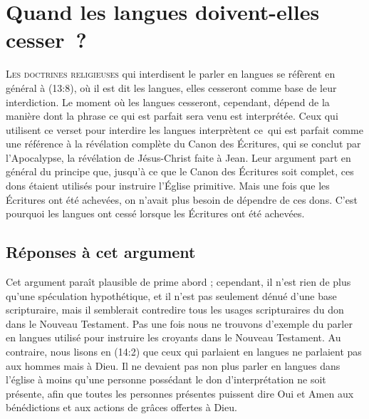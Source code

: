 \chapter{Quand les langues doivent-elles cesser~?}

\lettrine{L}{es doctrines religieuses} qui interdisent le parler en langues
 se réfèrent en général à (13:8), où il est dit\frcolon{}
 \Og les langues, elles cesseront \Fg{} comme base de leur interdiction.
 Le moment où les langues cesseront, cependant, dépend de la manière
 dont la phrase\frcolon{} \Og ce qui est parfait sera venu \Fg{} est interprétée.
 Ceux qui utilisent ce verset pour interdire les langues interprètent
 \Og ce~qui est parfait \Fg{} comme une référence à la révélation complète
 du Canon des Écritures, qui se conclut par l'Apocalypse,
 la révélation de Jésus-Christ faite à Jean. Leur argument part en général du principe que,
 jusqu'à ce que le Canon des Écritures soit complet, ces dons étaient
 utilisés pour instruire l'Église primitive. Mais une fois que les Écritures
 ont été achevées, on n'avait plus besoin de dépendre de ces dons.
 C'est pourquoi les langues ont cessé lorsque les Écritures
 ont été achevées.


\section{R\'eponses \`a cet argument}

Cet argument paraît plausible de prime abord ; cependant, il n'est rien
 de plus qu'une spéculation hypothétique, et il n'est pas seulement dénué
 d'une base scripturaire, mais il semblerait contredire tous les usages
 scripturaires du don dans le Nouveau Testament.
 Pas une fois nous ne trouvons d'exemple du parler en langues utilisé
 pour instruire les croyants dans le Nouveau Testament. Au contraire,
 nous lisons en (14:2) que ceux qui parlaient en langues
 ne parlaient pas aux hommes mais à Dieu. Il ne devaient pas non plus parler
 en langues dans l'église à moins qu'une personne possédant le don
 d'interprétation ne soit présente, afin que toutes les personnes présentes
 puissent dire \Og Oui \Fg{} et \Og Amen \Fg{} aux bénédictions
 et aux actions de grâces offertes à Dieu.

